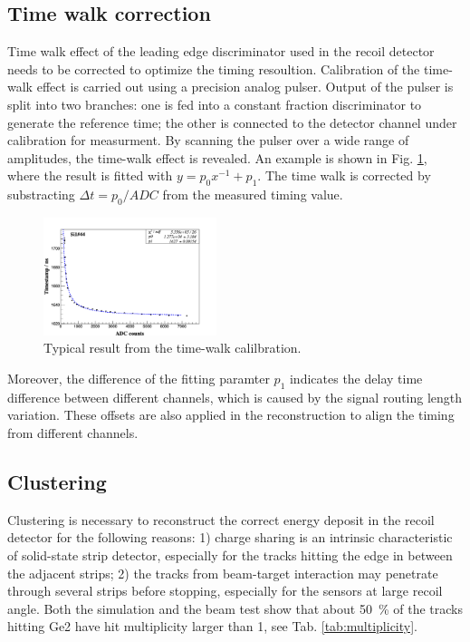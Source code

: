 \documentclass[number,5p]{elsarticle}
\begin{document}
\subsection{Time walk correction}
\label{sec:timewalk}

Time walk effect of the leading edge discriminator used in the recoil detector needs to be corrected to
optimize the timing resoultion.
Calibration of the time-walk effect is carried out using a  precision analog pulser. 
Output of the pulser is split into two branches: one is fed into a constant fraction discriminator to generate the reference time;
the other is connected to the detector channel under calibration for measurment. 
By scanning the pulser over a wide range of amplitudes, the time-walk effect is
revealed.
An example is shown in Fig. \ref{fig:timewalk}, where the result is fitted with \(y=p_0 x^{-1} + p_1\). 
The time walk is corrected by substracting \(\Delta t = p_0/ADC\) from the
measured timing value.

\begin{figure}[htbp]
  \centering
  \includegraphics[width=0.45\textwidth]{./timewalk.png}
  \caption{Typical result from the time-walk calilbration.}
  \label{fig:timewalk}
\end{figure}

Moreover, the difference of the fitting paramter \(p_1\) indicates the delay time
difference between different channels, which is caused by the signal routing length variation.
These offsets are also applied in the reconstruction to align the timing from different channels.

\subsection{Clustering}
\label{clustering}

Clustering is necessary to reconstruct the correct energy deposit in the
recoil detector for the following reasons: 1) charge sharing is an intrinsic characteristic of solid-state strip detector, especially
for the tracks hitting the edge in between the adjacent strips; 2) the tracks
from beam-target interaction may penetrate through several strips before
stopping, especially for the sensors  at large recoil angle.
Both the simulation and the beam test show that about \SI{50}{\percent} of the tracks hitting Ge2 have hit multiplicity
larger than 1, see Tab. \ref{tab:multiplicity}.
\end{document}
